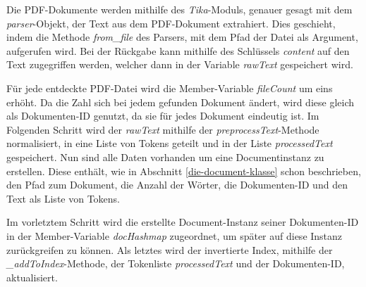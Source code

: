  Die PDF-Dokumente werden mithilfe des \textit{Tika}-Moduls, genauer gesagt mit dem \textit{parser}-Objekt, der Text aus dem PDF-Dokument extrahiert. Dies geschieht, indem die Methode \textit{from\_file} des Parsers, mit dem Pfad der Datei als Argument, aufgerufen wird. Bei der Rückgabe kann mithilfe des Schlüssels \textit{content} auf den Text zugegriffen werden, welcher dann in der Variable \textit{rawText} gespeichert wird.

Für jede entdeckte PDF-Datei wird die Member-Variable \textit{fileCount} um eins erhöht. Da die Zahl sich bei jedem gefunden Dokument ändert, wird diese gleich als Dokumenten-ID genutzt, da sie für jedes Dokument eindeutig ist. Im Folgenden Schritt wird der \textit{rawText} mithilfe der \textit{preprocessText}-Methode normalisiert, in eine Liste von Tokens geteilt und in der Liste \textit{processedText} gespeichert. Nun sind alle Daten vorhanden um eine Documentinstanz zu erstellen. Diese enthält, wie in Abschnitt \ref{die-document-klasse} schon beschrieben, den Pfad zum Dokument, die Anzahl der Wörter, die Dokumenten-ID und den Text als Liste von Tokens.

Im vorletztem Schritt wird die erstellte Document-Instanz seiner Dokumenten-ID in der Member-Variable \textit{docHashmap} zugeordnet, um später auf diese Instanz zurückgreifen zu können. Als letztes wird der invertierte Index, mithilfe der \textit{\_addToIndex}-Methode, der Tokenliste \textit{processedText} und der Dokumenten-ID, aktualisiert.

